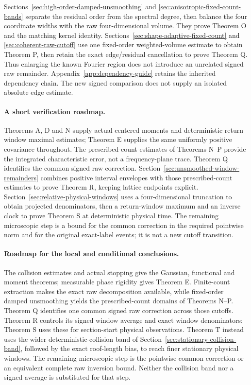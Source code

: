 \documentclass[11pt,reqno]{amsart}
\numberwithin{equation}{section}
\theoremstyle{definition}\newtheorem{definition}[theorem]{Definition}
\theoremstyle{remark}\newtheorem{remark}[theorem]{Remark}
\begin{document}
Sections~\ref{sec:high-order-damped-unsmoothing} and
\ref{sec:anisotropic-fixed-count-bands} separate the residual order from
the spectral degree, then balance the four coordinate widths with the
raw four-dimensional volume. They prove Theorem O and the matching
kernel identity. Sections~\ref{sec:shape-adaptive-fixed-count} and
\ref{sec:coherent-raw-cutoff} use one fixed-order weighted-volume
estimate to obtain Theorem P, then retain the exact edge/residual
cancellation to prove Theorem Q. Thus enlarging the known Fourier
region does not introduce an unrelated signed raw remainder.
Appendix~\ref{app:dependency-guide} retains the inherited dependency
chain. The new signed comparison does not supply an isolated
absolute edge estimate.

\paragraph{A short verification roadmap.}
Theorems A, D and N supply actual centered moments and deterministic
return-window maximal estimates; Theorem E supplies the same uniformly
positive covariance throughout. The prescribed-count estimates of
Theorems N--P provide the integrated characteristic error, not a
frequency-plane trace. Theorem Q identifies the common signed raw
correction. Section~\ref{sec:unsmoothed-window-remainders} combines
positive interval envelopes with those prescribed-count estimates to
prove Theorem R, keeping lattice endpoints explicit. Section~\ref{sec:relative-physical-windows}
uses a four-dimensional truncation to obtain projected denominators,
then a return-window maximum and an inverse clock to prove Theorem S
at deterministic physical time. The remaining microscopic step is a
bound for the common correction in the required pointwise norm and
for the original exact-label events; it is not a new cutoff transition.

\paragraph{Roadmap for the local and conditional conclusions.}
The collision estimates and actual stopping give the Gaussian,
functional and moment theorems; measurable phase rigidity gives
Theorem E. Finite-count extraction makes the exact raw decomposition
available, while fixed-order damped unsmoothing yields the
prescribed-count domains of Theorems N--P. Theorem Q identifies one
common signed raw correction across those cutoffs. Theorem R controls
its signed window average and exact window denominators; Theorem S
uses these for section-start physical observations. Theorem T instead
uses the wider deterministic-collision band of
Section~\ref{sec:stationary-collision-band}, followed by the exact
roof-length bias, to reach finer stationary physical windows.
The remaining microscopic step is the pointwise common correction
or an equivalent complete raw inversion bound. Neither the collision
band nor a signed average is substituted for that step.
\end{document}
